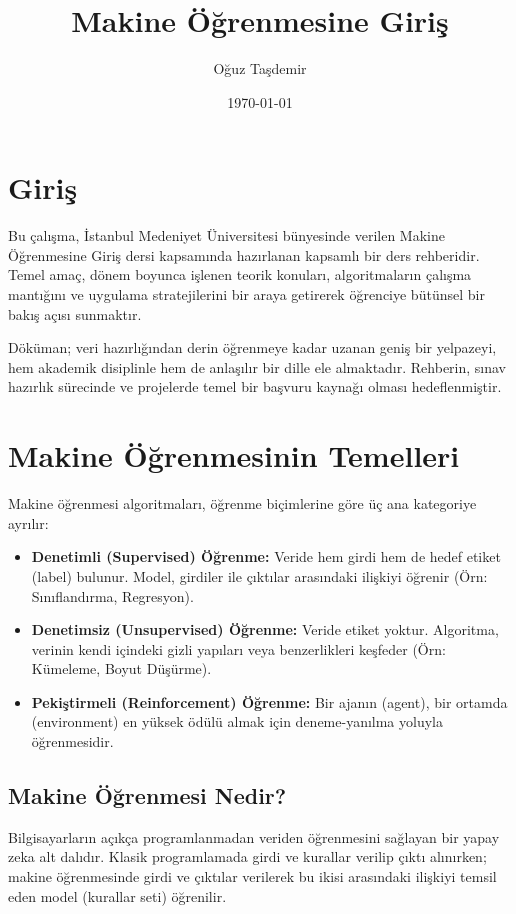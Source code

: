 \documentclass[12pt,a4paper]{article}
\title{\textbf{Makine Öğrenmesine Giriş}}
\author{Oğuz Taşdemir}
\date{\today}
\begin{document}
\maketitle
\newpage

\tableofcontents
\newpage

\newpage
\section*{Giriş}
Bu çalışma, İstanbul Medeniyet Üniversitesi bünyesinde verilen Makine Öğrenmesine Giriş dersi kapsamında hazırlanan kapsamlı bir ders rehberidir. Temel amaç, dönem boyunca işlenen teorik konuları, algoritmaların çalışma mantığını ve uygulama stratejilerini bir araya getirerek öğrenciye bütünsel bir bakış açısı sunmaktır. 

Döküman; veri hazırlığından derin öğrenmeye kadar uzanan geniş bir yelpazeyi, hem akademik disiplinle hem de anlaşılır bir dille ele almaktadır. Rehberin, sınav hazırlık sürecinde ve projelerde temel bir başvuru kaynağı olması hedeflenmiştir.

\newpage
\section{Makine Öğrenmesinin Temelleri}
Makine öğrenmesi algoritmaları, öğrenme biçimlerine göre üç ana kategoriye ayrılır:

\begin{itemize}
    \item \textbf{Denetimli (Supervised) Öğrenme:} Veride hem girdi hem de hedef etiket (label) bulunur. Model, girdiler ile çıktılar arasındaki ilişkiyi öğrenir (Örn: Sınıflandırma, Regresyon).
    \item \textbf{Denetimsiz (Unsupervised) Öğrenme:} Veride etiket yoktur. Algoritma, verinin kendi içindeki gizli yapıları veya benzerlikleri keşfeder (Örn: Kümeleme, Boyut Düşürme).
    \item \textbf{Pekiştirmeli (Reinforcement) Öğrenme:} Bir ajanın (agent), bir ortamda (environment) en yüksek ödülü almak için deneme-yanılma yoluyla öğrenmesidir.
\end{itemize}

\subsection{Makine Öğrenmesi Nedir?}
Bilgisayarların açıkça programlanmadan veriden öğrenmesini sağlayan bir yapay zeka alt dalıdır. Klasik programlamada girdi ve kurallar verilip çıktı alınırken; makine öğrenmesinde girdi ve çıktılar verilerek bu ikisi arasındaki ilişkiyi temsil eden model (kurallar seti) öğrenilir.
\end{document}
